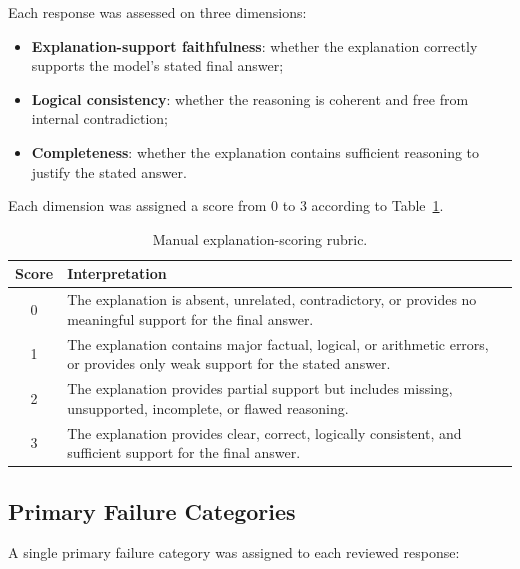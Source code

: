 Each response was assessed on three dimensions:

\begin{itemize}
    \item \textbf{Explanation-support faithfulness}: whether the explanation
    correctly supports the model's stated final answer;

    \item \textbf{Logical consistency}: whether the reasoning is coherent and
    free from internal contradiction;

    \item \textbf{Completeness}: whether the explanation contains sufficient
    reasoning to justify the stated answer.
\end{itemize}

Each dimension was assigned a score from 0 to 3 according to
Table~\ref{tab:appendix_rubric}.

\begin{table}[t]
\centering
\small
\caption{Manual explanation-scoring rubric.}
\label{tab:appendix_rubric}
\begin{tabular}{cp{8.8cm}}
\toprule
\textbf{Score} & \textbf{Interpretation} \\
\midrule
0 &
The explanation is absent, unrelated, contradictory, or provides no
meaningful support for the final answer. \\

1 &
The explanation contains major factual, logical, or arithmetic errors, or
provides only weak support for the stated answer. \\

2 &
The explanation provides partial support but includes missing, unsupported,
incomplete, or flawed reasoning. \\

3 &
The explanation provides clear, correct, logically consistent, and sufficient
support for the final answer. \\
\bottomrule
\end{tabular}
\end{table}

\subsection{Primary Failure Categories}

A single primary failure category was assigned to each reviewed response:

